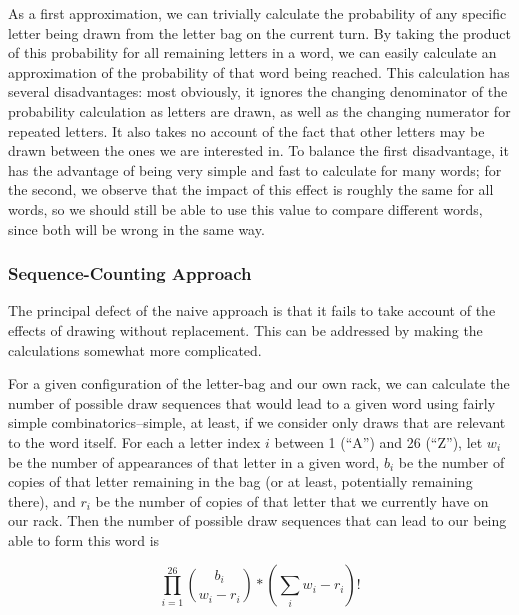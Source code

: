 \documentclass[11pt]{article}
\begin{document}
As a first approximation, we can trivially calculate the probability of any specific letter being drawn from the letter bag on the current turn.  By taking the product of this probability for all remaining letters in a word, we can easily calculate an approximation of the probability of that word being reached.  This calculation has several disadvantages: most obviously, it ignores the changing denominator of the probability calculation as letters are drawn, as well as the changing numerator for repeated letters.  It also takes no account of the fact that other letters may be drawn between the ones we are interested in.  To balance the first disadvantage, it has the advantage of being very simple and fast to calculate for many words; for the second, we observe that the impact of this effect is roughly the same for all words, so we should still be able to use this value to compare different words, since both will be wrong in the same way.

\subsubsection{Sequence-Counting Approach}
\label{sec:sequenceCounting}

The principal defect of the naive approach is that it fails to take account of the effects of drawing without replacement.  This can be addressed by making the calculations somewhat more complicated.

For a given configuration of the letter-bag and our own rack, we can calculate the number of possible draw sequences that would lead to a given word using fairly simple combinatorics--simple, at least, if we consider only draws that are relevant to the word itself.  For each a letter index $i$ between 1 (``A'') and 26 (``Z''), let $w_{i}$ be the number of appearances of that letter in a given word, $b_{i}$ be the number of copies of that letter remaining in the bag (or at least, potentially remaining there), and $r_{i}$ be the number of copies of that letter that we currently have on our rack.  Then the number of possible draw sequences that can lead to our being able to form this word is

$$\prod_{i=1}^{26}{b_{i}\choose w_{i} - r_{i}}*\left( \sum_{i}w_{i} - r_{i}\right)!$$
\end{document}
